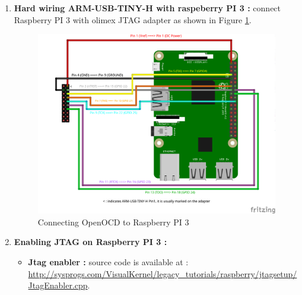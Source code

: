 \begin{enumerate}
		\begin{enumerate}
			\item \textbf{Hard wiring ARM-USB-TINY-H with raspeberry PI 3 : } connect Raspberry PI 3 with olimex JTAG adapter as shown in {Figure \ref{Connecting OpenOCD to Raspberry PI 3}}.
				\begin{figure}[H]
					\centering
        				\includegraphics[scale=0.55]{img/solution/raspberry-PI-3-openocd-wiring.png}
        				\caption{Connecting OpenOCD to Raspberry PI 3}
        				\label{Connecting OpenOCD to Raspberry PI 3}
    			\end{figure}
    	
    		\item \textbf{Enabling JTAG on Raspberry PI 3 : }
    			\begin{itemize}
    				\item \textbf{Jtag enabler : } source code is available at : {\color{blue}\url{http://sysprogs.com/VisualKernel/legacy\_tutorials/raspberry/jtagsetup/JtagEnabler.cpp}}.
    				

\end{itemize}
\end{enumerate}
\end{enumerate}
